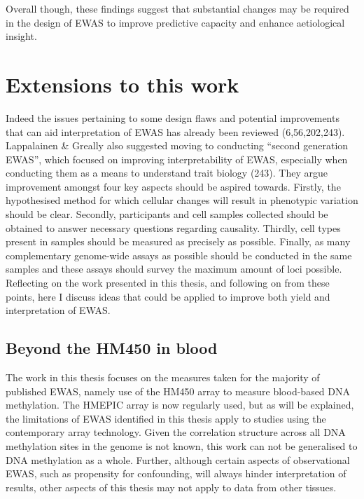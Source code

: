 \documentclass[11pt,oneside]{bristolthesis}
\begin{document}
Overall though, these findings suggest that substantial changes may be required in the design of EWAS to improve predictive capacity and enhance aetiological insight.

\hypertarget{extensions-to-work}{%
\section{Extensions to this work}\label{extensions-to-work}}

Indeed the issues pertaining to some design flaws and potential improvements that can aid interpretation of EWAS has already been reviewed (6,56,202,243). Lappalainen \& Greally also suggested moving to conducting ``second generation EWAS'', which focused on improving interpretability of EWAS, especially when conducting them as a means to understand trait biology (243). They argue improvement amongst four key aspects should be aspired towards. Firstly, the hypothesised method for which cellular changes will result in phenotypic variation should be clear. Secondly, participants and cell samples collected should be obtained to answer necessary questions regarding causality. Thirdly, cell types present in samples should be measured as precisely as possible. Finally, as many complementary genome-wide assays as possible should be conducted in the same samples and these assays should survey the maximum amount of loci possible. Reflecting on the work presented in this thesis, and following on from these points, here I discuss ideas that could be applied to improve both yield and interpretation of EWAS.

\hypertarget{beyond-the-hm450}{%
\subsection{Beyond the HM450 in blood}\label{beyond-the-hm450}}

The work in this thesis focuses on the measures taken for the majority of published EWAS, namely use of the HM450 array to measure blood-based DNA methylation. The HMEPIC array is now regularly used, but as will be explained, the limitations of EWAS identified in this thesis apply to studies using the contemporary array technology. Given the correlation structure across all DNA methylation sites in the genome is not known, this work can not be generalised to DNA methylation as a whole. Further, although certain aspects of observational EWAS, such as propensity for confounding, will always hinder interpretation of results, other aspects of this thesis may not apply to data from other tissues.
\end{document}
